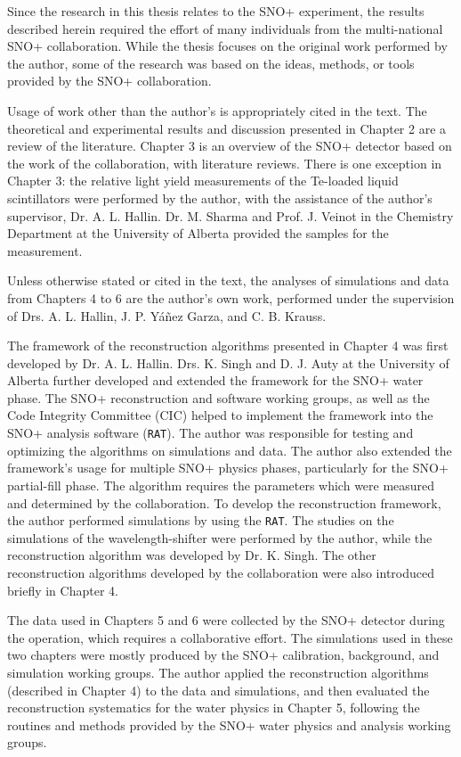 Since the research in this thesis relates to the SNO+ experiment, the results described herein required the effort of many individuals from the multi-national SNO+ collaboration. While the thesis focuses on the original work performed by the author, some of the research was based on the ideas, methods, or tools provided by the SNO+ collaboration.

Usage of work other than the author's is appropriately cited in the text. The theoretical and experimental results and discussion presented in Chapter 2 are a review of the literature. Chapter 3 is an overview of the SNO+ detector based on the work of the collaboration, with literature reviews. There is one exception in Chapter 3: the relative light yield measurements of the Te-loaded liquid scintillators were performed by the author, with the assistance of the author's supervisor, Dr. A. L. Hallin. Dr. M. Sharma and Prof. J. Veinot in the Chemistry Department at the University of Alberta provided the samples for the measurement.

Unless otherwise stated or cited in the text, the analyses of simulations and data from Chapters 4 to 6 are the author's own work, performed under the supervision of Drs. A. L. Hallin, J. P. Y\'{a}\~{n}ez Garza, and C. B. Krauss.

The framework of the reconstruction algorithms presented in Chapter 4 was first developed by Dr. A. L. Hallin. Drs. K. Singh and D. J. Auty at the University of Alberta further developed and extended the framework for the SNO+ water phase. The SNO+ reconstruction and software working groups, as well as the Code Integrity Committee (CIC) helped to implement the framework into the SNO+ analysis software (\texttt{RAT}). The author was responsible for testing and optimizing the algorithms on simulations and data. The author also extended the framework's usage for multiple SNO+ physics phases, particularly for the SNO+ partial-fill phase. The algorithm requires the parameters which were measured and determined by the collaboration. To develop the reconstruction framework, the author performed simulations by using the \texttt{RAT}. The studies on the simulations of the wavelength-shifter were performed by the author, while the reconstruction algorithm was developed by Dr. K. Singh. The other reconstruction algorithms developed by the collaboration were also introduced briefly in Chapter 4.

The data used in Chapters 5 and 6 were collected by the SNO+ detector during the operation, which requires a collaborative effort. The simulations used in these two chapters were mostly produced by the SNO+ calibration, background, and simulation working groups. The author applied the reconstruction algorithms (described in Chapter 4) to the data and simulations, and then evaluated the reconstruction systematics for the water physics in Chapter 5, following the routines and methods provided by the SNO+ water physics and analysis working groups.

